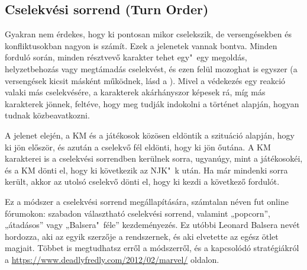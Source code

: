 \label{Cselekvési sorrend}
\subsection[Cselekvési sorrend]{Cselekvési sorrend (Turn Order)}

Gyakran nem érdekes, hogy ki pontosan mikor cselekszik, de versengésekben és konfliktusokban nagyon is számít. Ezek a jelenetek  vannak bontva. Minden forduló során, minden résztvevő karakter tehet egy"~egy megoldás, helyzetbehozás vagy megtámadás cselekvést, és ezen felül mozoghat is egyszer (a versengések kicsit másként működnek, lásd a ). Mivel a védekezés egy reakció valaki más cselekvésére, a karakterek akárhányszor képesek rá, míg más karakterek jönnek, feltéve, hogy meg tudják indokolni a történet alapján, hogyan tudnak közbeavatkozni.

A jelenet elején, a KM és a játékosok közösen eldöntik a szituáció alapján, hogy ki jön először, és azután a cselekvő fél eldönti, hogy ki jön őutána. A KM karakterei is a cselekvési sorrendben kerülnek sorra, ugyanúgy, mint a játékosokéi, és a KM dönti el, hogy ki következik az NJK"~k után. Ha már mindenki sorra került, akkor az utolsó cselekvő dönti el, hogy ki kezdi a következő fordulót.


Ez a módszer a cselekvési sorrend megállapítására, számtalan néven fut online fórumokon: szabadon választható cselekvési sorrend, valamint „popcorn”, „átadásos” vagy „Balsera"~féle” kezdeményezés. Ez utóbbi Leonard Balsera nevét hordozza, aki az egyik szerzője a  rendszernek, és aki elvetette az egész ötlet magjait. Többet is megtudhatsz erről a módszerről, és a kapcsolódó stratégiákról a \url{https://www.deadlyfredly.com/2012/02/marvel/} oldalon.
